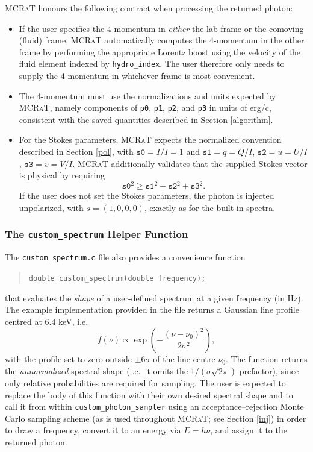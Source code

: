 \documentclass[12pt,a4paper]{article}
\newcommand{\mcrat}{\textsc{MCRaT}}
\begin{document}
\mcrat{} honours the following contract when processing the returned photon:
\begin{itemize}
	\item If the user specifies the 4-momentum in \emph{either} the lab frame or the comoving (fluid) frame, \mcrat{} automatically computes the 4-momentum in the other frame by performing the appropriate Lorentz boost using the velocity of the fluid element indexed by \texttt{hydro\_index}. The user therefore only needs to supply the 4-momentum in whichever frame is most convenient.
	\item The 4-momentum must use the normalizations and units expected by \mcrat{}, namely components of \texttt{p0}, \texttt{p1}, \texttt{p2}, and \texttt{p3} in units of erg/c, consistent with the saved quantities described in Section \ref{algorithm}.
	\item For the Stokes parameters, \mcrat{} expects the normalized convention described in Section \ref{pol}, with $\mathtt{s0}=I/I=1$ and $\mathtt{s1}=q=Q/I$, $\mathtt{s2}=u=U/I$, $\mathtt{s3}=v=V/I$. \mcrat{} additionally validates that the supplied Stokes vector is physical by requiring
	\[
	\mathtt{s0}^2 \ge \mathtt{s1}^2 + \mathtt{s2}^2 + \mathtt{s3}^2.
	\]
	If the user does not set the Stokes parameters, the photon is injected unpolarized, with $s=(1,0,0,0)$, exactly as for the built-in spectra.
\end{itemize}

\subsubsection{The \texttt{custom\_spectrum} Helper Function}
The \texttt{custom\_spectrum.c} file also provides a convenience function
\begin{quotation}
	\texttt{double custom\_spectrum(double frequency);}
\end{quotation}
that evaluates the \emph{shape} of a user-defined spectrum at a given frequency (in Hz). The example implementation provided in the file returns a Gaussian line profile centred at 6.4 keV, i.e.
\[
f(\nu) \propto \exp\!\left(-\frac{(\nu-\nu_0)^2}{2\sigma^2}\right),
\]
with the profile set to zero outside $\pm 6\sigma$ of the line centre $\nu_0$. The function returns the \emph{unnormalized} spectral shape (i.e.\ it omits the $1/(\sigma\sqrt{2\pi})$ prefactor), since only relative probabilities are required for sampling. The user is expected to replace the body of this function with their own desired spectral shape and to call it from within \texttt{custom\_photon\_sampler} using an acceptance--rejection Monte Carlo sampling scheme (as is used throughout \mcrat{}; see Section \ref{inj}) in order to draw a frequency, convert it to an energy via $E=h\nu$, and assign it to the returned photon.
\end{document}
